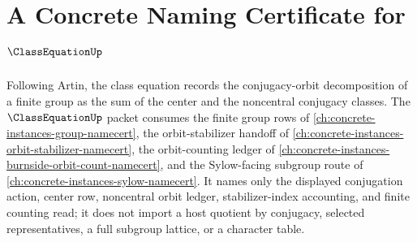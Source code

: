 \chapter{A Concrete Naming Certificate for $\ClassEquationUp$}
\label{ch:concrete-instances-class-equation-namecert}

Following Artin, the class equation records the conjugacy-orbit decomposition of a finite group as the sum of the center and the noncentral conjugacy classes. The $\ClassEquationUp$ packet consumes the finite group rows of \autoref{ch:concrete-instances-group-namecert}, the orbit-stabilizer handoff of \autoref{ch:concrete-instances-orbit-stabilizer-namecert}, the orbit-counting ledger of \autoref{ch:concrete-instances-burnside-orbit-count-namecert}, and the Sylow-facing subgroup route of \autoref{ch:concrete-instances-sylow-namecert}. It names only the displayed conjugation action, center row, noncentral orbit ledger, stabilizer-index accounting, and finite counting read; it does not import a host quotient by conjugacy, selected representatives, a full subgroup lattice, or a character table.

